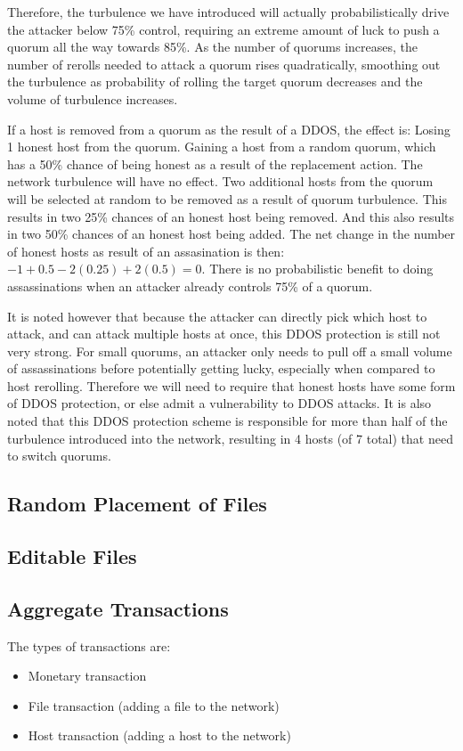 \documentclass[twocolumn]{article}
\begin{document}
Therefore, the turbulence we have introduced will actually probabilistically drive the attacker below 75\% control, requiring an extreme amount of luck to push a quorum all the way towards 85\%.
As the number of quorums increases, the number of rerolls needed to attack a quorum rises quadratically, smoothing out the turbulence as probability of rolling the target quorum decreases and the volume of turbulence increases.

If a host is removed from a quorum as the result of a DDOS, the effect is:
Losing 1 honest host from the quorum.
Gaining a host from a random quorum, which has a 50\% chance of being honest as a result of the replacement action.
The network turbulence will have no effect.
Two additional hosts from the quorum will be selected at random to be removed as a result of quorum turbulence.
This results in two 25\% chances of an honest host being removed.
And this also results in two 50\% chances of an honest host being added.
The net change in the number of honest hosts as result of an assasination is then: $-1 + 0.5 - 2(0.25) + 2(0.5) = 0$.
There is no probabilistic benefit to doing assassinations when an attacker already controls 75\% of a quorum.

It is noted however that because the attacker can directly pick which host to attack, and can attack multiple hosts at once, this DDOS protection is still not very strong.
For small quorums, an attacker only needs to pull off a small volume of assassinations before potentially getting lucky, especially when compared to host rerolling.
Therefore we will need to require that honest hosts have some form of DDOS protection, or else admit a vulnerability to DDOS attacks.
It is also noted that this DDOS protection scheme is responsible for more than half of the turbulence introduced into the network, resulting in 4 hosts (of 7 total) that need to switch quorums.

\subsection{Random Placement of Files}

\subsection{Editable Files}

\subsection{Aggregate Transactions}
The types of transactions are:
\begin{itemize}
	\item Monetary transaction
	\item File transaction (adding a file to the network)
	\item Host transaction (adding a host to the network)
\end{itemize}
\end{document}
